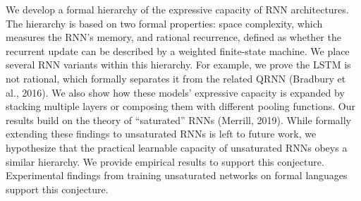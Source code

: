 We develop a formal hierarchy of the expressive capacity of RNN architectures. The hierarchy is based on two formal properties: space complexity, which measures the RNN's memory, and rational recurrence, defined as whether the recurrent update can be described by a weighted finite-state machine. We place several RNN variants within this hierarchy. For example, we prove the LSTM is not rational, which formally separates it from the related QRNN (Bradbury et al., 2016). We also show how these models' expressive capacity is expanded by stacking multiple layers or composing them with different pooling functions. Our results build on the theory of ``saturated'' RNNs (Merrill, 2019). While formally extending these findings to unsaturated RNNs is left to future work, we hypothesize that the practical learnable capacity of unsaturated RNNs obeys a similar hierarchy. We provide empirical results to support this conjecture. Experimental findings from training unsaturated networks on formal languages support this conjecture.

